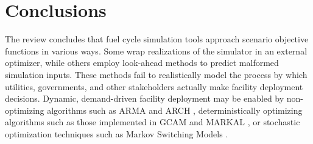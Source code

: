 \section{Conclusions}


        The review concludes that fuel cycle simulation tools approach scenario objective functions in 
        various ways.  Some wrap realizations of the simulator in an external 
        optimizer, while others employ look-ahead methods to predict malformed 
        simulation inputs.  These methods fail to realistically model the 
        process by which utilities, governments, and other stakeholders 
        actually make facility deployment decisions. Dynamic, demand-driven 
        facility deployment may be enabled by non-optimizing algorithms such as 
        \gls{ARMA} \cite{arma} and \gls{ARCH} \cite{arch}, deterministically 
        optimizing algorithms such as those implemented in \gls{GCAM} 
        \cite{gcam} and \gls{MARKAL} \cite{markal}, or stochastic optimization 
        techniques such as Markov Switching Models \cite{markovswitching}.
